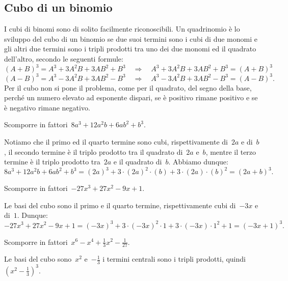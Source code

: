 \subsection{Cubo di un binomio}
I cubi di binomi sono di solito facilmente riconoscibili. Un quadrinomio è lo sviluppo del cubo di un binomio se due suoi termini sono i cubi
di due monomi e gli altri due termini sono i tripli prodotti tra uno dei due monomi ed il quadrato dell’altro, secondo le seguenti formule: %
\begin{equation*}
(A+B)^{3}=A^{3}+3A^{2}B+3AB^{2}+B^{3}\quad \Rightarrow \quad A^{3}+3A^{2}B+3AB^{2}+B^{3}=(A+B)^{3}\phantom{.}
\end{equation*}
\begin{equation*}
(A-B)^{3}=A^{3}-3A^{2}B+3AB^{2}-B^{3}\quad \Rightarrow \quad A^{3}-3A^{2}B+3AB^{2}-B^{3}=(A-B)^{3}.
\end{equation*}
Per il cubo non si pone il problema, come per il quadrato, del segno della base, perché un numero elevato ad esponente dispari,
se è positivo rimane positivo e se è negativo rimane negativo.

\begin{exrig}
 \begin{esempio}
Scomporre in fattori~$8a^{3}+12a^{2}b+6{ab}^{2}+b^{3}$.

Notiamo che il primo ed il quarto termine sono cubi, rispettivamente di~$2a$ e di~$b$, il secondo termine è il triplo
prodotto tra il quadrato di~$2a$ e~$b$, mentre il terzo termine è il triplo prodotto tra~$2a$ e il quadrato di~$b$.
Abbiamo dunque:
\[8a^{3}+12a^{2}b+6ab^{2}+b^{3}=(2a)^{3}+3\cdot (2a)^{2}\cdot (b)+3\cdot (2a)\cdot (b)^{2}=(2a+b)^{3}.\]
 \end{esempio}

 \begin{esempio}
Scomporre in fattori~$-27x^{3}+27x^{2}-9x+1$.

Le basi del cubo sono il primo e il quarto termine, rispettivamente cubi di~$-3x$ e di~$1$.
Dunque:
\[-27x^{3}+27x^{2}-9x+1=(-3x)^{3}+3\cdot (-3x)^{2}\cdot 1+3\cdot (-3x)\cdot 1^{2}+1=(-3x+1)^{3}.\]
 \end{esempio}

 \begin{esempio}
Scomporre in fattori~$x^{6}-x^{4}+\frac{1}{3}x^{2}-\frac{1}{27}$.

Le basi del cubo sono~$x^{2}$ e~$-\frac{1}{3}$ i termini centrali sono i tripli prodotti,
quindi~$\left(x^{2}-\frac{1}{3}\right)^{3}$.
\end{esempio}
\end{exrig}
\ovalbox{\risolvii \ref{ese:13.38}, \ref{ese:13.39}, \ref{ese:13.40}, \ref{ese:13.41}, \ref{ese:13.42}, \ref{ese:13.43}, \ref{ese:13.44}, \ref{ese:13.45},\ref{ese:13.46}}


